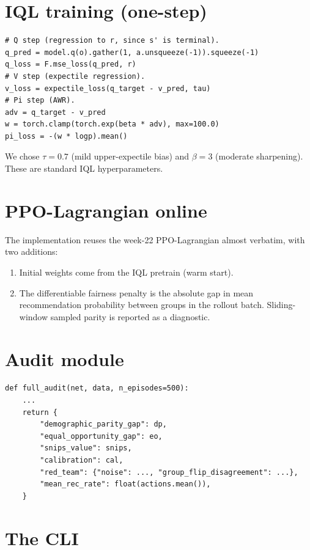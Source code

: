 \documentclass[11pt,oneside]{scrbook}
\begin{document}
\section{IQL training (one-step)}

\begin{verbatim}
# Q step (regression to r, since s' is terminal).
q_pred = model.q(o).gather(1, a.unsqueeze(-1)).squeeze(-1)
q_loss = F.mse_loss(q_pred, r)
# V step (expectile regression).
v_loss = expectile_loss(q_target - v_pred, tau)
# Pi step (AWR).
adv = q_target - v_pred
w = torch.clamp(torch.exp(beta * adv), max=100.0)
pi_loss = -(w * logp).mean()
\end{verbatim}

We chose $\tau = 0.7$ (mild upper-expectile bias) and $\beta = 3$ (moderate
sharpening). These are standard IQL hyperparameters.

\section{PPO-Lagrangian online}

The implementation reuses the week-22 PPO-Lagrangian almost verbatim, with
two additions:

\begin{enumerate}[leftmargin=*]
  \item Initial weights come from the IQL pretrain (warm start).
  \item The differentiable fairness penalty is the absolute gap in mean
        recommendation probability between groups in the rollout batch.
        Sliding-window sampled parity is reported as a diagnostic.
\end{enumerate}

\section{Audit module}

\begin{verbatim}
def full_audit(net, data, n_episodes=500):
    ...
    return {
        "demographic_parity_gap": dp,
        "equal_opportunity_gap": eo,
        "snips_value": snips,
        "calibration": cal,
        "red_team": {"noise": ..., "group_flip_disagreement": ...},
        "mean_rec_rate": float(actions.mean()),
    }
\end{verbatim}

\section{The CLI}
\end{document}
